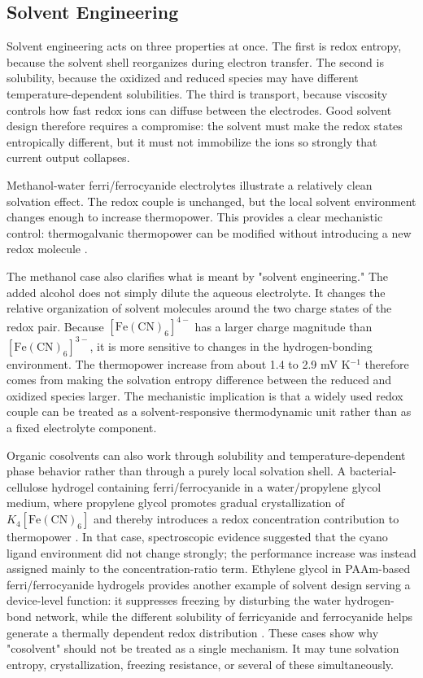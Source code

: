 \subsection{Solvent Engineering}

Solvent engineering acts on three properties at once. The first is redox
entropy, because the solvent shell reorganizes during electron transfer. The
second is solubility, because the oxidized and reduced species may have
different temperature-dependent solubilities. The third is transport, because
viscosity controls how fast redox ions can diffuse between the electrodes.
Good solvent design therefore requires a compromise: the solvent must make the
redox states entropically different, but it must not immobilize the ions so
strongly that current output collapses.

Methanol-water ferri/ferrocyanide electrolytes illustrate a relatively clean
solvation effect. The redox couple is unchanged, but the local solvent
environment changes enough to increase thermopower. This provides a clear
mechanistic control: thermogalvanic thermopower can be modified
without introducing a new redox molecule \citep{kim2017high}.

The methanol case also clarifies what is meant by "solvent engineering." The
added alcohol does not simply dilute the aqueous electrolyte. It changes the
relative organization of solvent molecules around the two charge states of the
redox pair. Because $[\mathrm{Fe(CN)}_6]^{4-}$ has a larger charge magnitude
than $[\mathrm{Fe(CN)}_6]^{3-}$, it is more sensitive to changes in the
hydrogen-bonding environment. The thermopower increase from about 1.4 to
2.9 mV K$^{-1}$ therefore comes from making the solvation entropy difference
between the reduced and oxidized species larger. The mechanistic implication is
that a widely used redox couple can be treated as a solvent-responsive
thermodynamic unit rather than as a fixed electrolyte component.

Organic cosolvents can also work through solubility and temperature-dependent
phase behavior rather than through a purely local solvation shell. A
bacterial-cellulose hydrogel containing ferri/ferrocyanide
in a water/propylene glycol medium, where propylene glycol promotes gradual
crystallization of $K_4[\mathrm{Fe(CN)}_6]$ and thereby introduces a redox
concentration contribution to thermopower \citep{yin2023bacterial}. In that
case, spectroscopic evidence suggested that the cyano ligand environment did
not change strongly; the performance increase was instead assigned mainly to
the concentration-ratio term. Ethylene glycol in PAAm-based ferri/ferrocyanide
hydrogels provides another example of solvent design serving a device-level
function: it suppresses freezing by disturbing the water hydrogen-bond network,
while the different solubility of ferricyanide and ferrocyanide helps generate
a thermally dependent redox distribution \citep{liu2024subzero}. These cases
show why "cosolvent" should not be treated as a single mechanism. It may tune
solvation entropy, crystallization, freezing resistance, or several of these
simultaneously.

